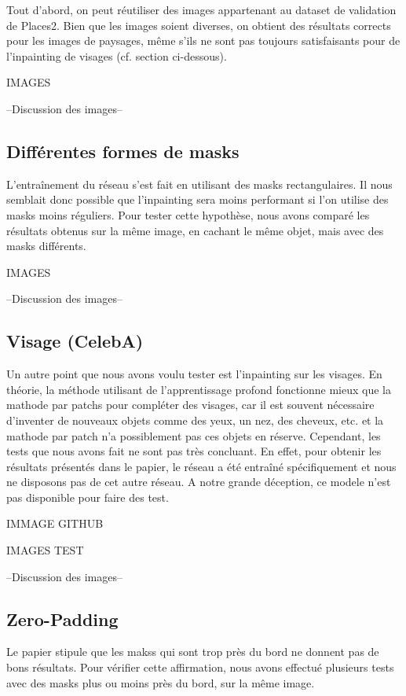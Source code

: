 \documentclass[12pt]{article}
\begin{document}
Tout d'abord, on peut réutiliser des images appartenant au dataset de validation de Places2. Bien que les images soient diverses, on obtient des résultats corrects pour les images de paysages, même s'ils ne sont pas toujours satisfaisants pour de l'inpainting de visages (cf. section ci-dessous).

IMAGES

--Discussion des images--

\subsection{Différentes formes de masks}

L'entraînement du réseau s'est fait en utilisant des masks rectangulaires. Il nous semblait donc possible que l'inpainting sera moins performant si l'on utilise des masks moins réguliers. Pour tester cette hypothèse, nous avons comparé les résultats obtenus sur la même image, en cachant le même objet, mais avec des masks différents.

IMAGES

--Discussion des images--

\subsection{Visage (CelebA)}

Un autre point que nous avons voulu tester est l'inpainting sur les visages. En théorie, la méthode utilisant de l'apprentissage profond fonctionne mieux que la mathode par patchs pour compléter des visages, car il est souvent nécessaire d'inventer de nouveaux objets comme des yeux, un nez, des cheveux, etc. et la mathode par patch n'a possiblement pas ces objets en réserve. Cependant, les tests que nous avons fait ne sont pas très concluant. En effet, pour obtenir les résultats présentés dans le papier, le réseau a été entraîné spécifiquement et nous ne disposons pas de cet autre réseau. A notre grande déception, ce modele n'est pas disponible pour faire des test.

IMMAGE GITHUB

IMAGES TEST

--Discussion des images--

\subsection{Zero-Padding}

Le papier stipule que les makss qui sont trop près du bord ne donnent pas de bons résultats. Pour vérifier cette affirmation, nous avons effectué plusieurs tests avec des masks plus ou moins près du bord, sur la même image.
\end{document}
